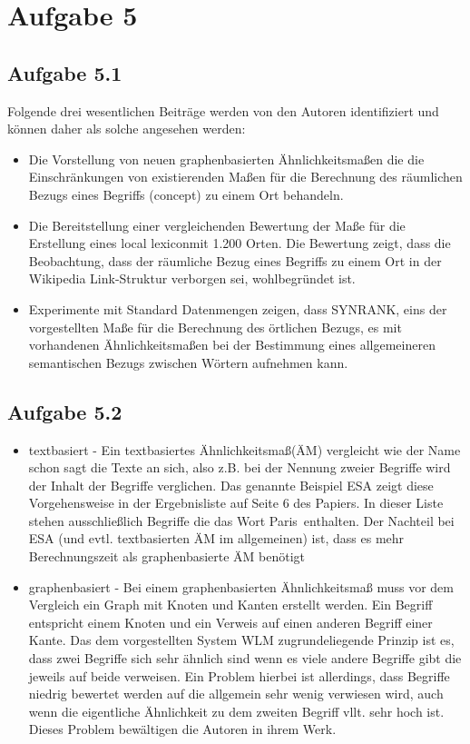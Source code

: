 \section*{Aufgabe 5}
\subsection*{Aufgabe 5.1}
Folgende drei wesentlichen Beiträge werden von den Autoren identifiziert und können daher als solche angesehen werden:
\begin{itemize}
\item Die Vorstellung von neuen graphenbasierten Ähnlichkeitsmaßen die die Einschränkungen von existierenden Maßen für die Berechnung des räumlichen Bezugs eines Begriffs (concept) zu einem Ort behandeln.
\item Die Bereitstellung einer vergleichenden Bewertung der Maße für die Erstellung eines \glqq local lexicon\grqq mit 1.200 Orten. Die Bewertung zeigt, dass die Beobachtung, dass der räumliche Bezug eines Begriffs zu einem Ort in der Wikipedia Link-Struktur verborgen sei, wohlbegründet ist.
\item Experimente mit Standard Datenmengen zeigen, dass SYNRANK, eins der vorgestellten Maße für die Berechnung des örtlichen Bezugs, es mit vorhandenen Ähnlichkeitsmaßen bei der Bestimmung eines allgemeineren semantischen Bezugs zwischen Wörtern aufnehmen kann.
\end{itemize}
\subsection*{Aufgabe 5.2}
\begin{itemize}
\item textbasiert - Ein textbasiertes Ähnlichkeitsmaß(ÄM) vergleicht wie der Name schon sagt die Texte an sich, also z.B. bei der Nennung zweier Begriffe wird der Inhalt der Begriffe verglichen. Das genannte Beispiel ESA zeigt diese Vorgehensweise in der Ergebnisliste auf Seite 6 des Papiers. In dieser Liste stehen ausschließlich Begriffe die das Wort \glqq Paris\grqq \ enthalten. Der Nachteil bei ESA (und evtl. textbasierten ÄM im allgemeinen) ist, dass es mehr Berechnungszeit als graphenbasierte ÄM benötigt
\item graphenbasiert - Bei einem graphenbasierten Ähnlichkeitsmaß muss vor dem Vergleich ein Graph mit Knoten und Kanten erstellt werden. Ein Begriff entspricht einem Knoten und ein Verweis auf einen anderen Begriff einer Kante. Das dem vorgestellten System WLM zugrundeliegende Prinzip ist es, dass zwei Begriffe sich sehr ähnlich sind wenn es viele andere Begriffe gibt die jeweils auf beide verweisen. Ein Problem hierbei ist allerdings, dass Begriffe niedrig bewertet werden auf die allgemein sehr wenig verwiesen wird, auch wenn die eigentliche Ähnlichkeit zu dem zweiten Begriff vllt. sehr hoch ist. Dieses Problem bewältigen die Autoren in ihrem Werk.
\end{itemize}
